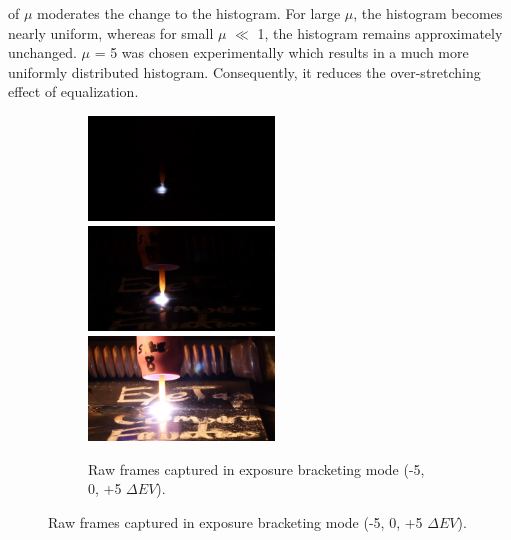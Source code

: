 of $\mu$ moderates the change to the histogram. For large $\mu$, the histogram becomes nearly 
uniform, whereas for small $\mu$ $\ll$ 1, the histogram remains approximately unchanged. $\mu$ = 
5 was chosen experimentally which results in a much more uniformly distributed histogram. 
Consequently, it reduces the over-stretching effect of equalization.
\begin{figure}
\center
\begin{subfigure}[b]{6.0in}
\centering
  \includegraphics[width=1.95in]{ch2/diagrams/frames/5stops/image3.jpg} 
  \includegraphics[width=1.95in]{ch2/diagrams/frames/5stops/image2.jpg}
  \includegraphics[width=1.95in]{ch2/diagrams/frames/5stops/image1.jpg}
  \caption{Raw frames captured in exposure bracketing mode (-5, 0, +5 $\Delta EV$). }
  \label{fig:image_set_multiple}
\end{subfigure}


\end{figure}
